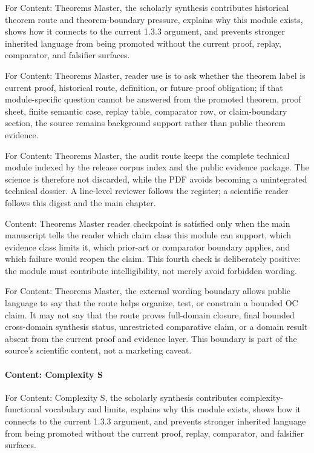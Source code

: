 For Content: Theorems Master, the scholarly synthesis contributes historical theorem route and theorem-boundary pressure, explains why this module exists, shows how it connects to the current 1.3.3 argument, and prevents stronger inherited language from being promoted without the current proof, replay, comparator, and falsifier surfaces.


For Content: Theorems Master, reader use is to ask whether the theorem label is current proof, historical route, definition, or future proof obligation; if that module-specific question cannot be answered from the promoted theorem, proof sheet, finite semantic case, replay table, comparator row, or claim-boundary section, the source remains background support rather than public theorem evidence.


For Content: Theorems Master, the audit route keeps the complete technical module indexed by the release corpus index and the public evidence package. The science is therefore not discarded, while the PDF avoids becoming a unintegrated technical dossier. A line-level reviewer follows the register; a scientific reader follows this digest and the main chapter.


Content: Theorems Master reader checkpoint is satisfied only when the main manuscript tells the reader which claim class this module can support, which evidence class limits it, which prior-art or comparator boundary applies, and which failure would reopen the claim. This fourth check is deliberately positive: the module must contribute intelligibility, not merely avoid forbidden wording.


For Content: Theorems Master, the external wording boundary allows public language to say that the route helps organize, test, or constrain a bounded OC claim. It may not say that the route proves full-domain closure, final bounded cross-domain synthesis status, unrestricted comparative claim, or a domain result absent from the current proof and evidence layer. This boundary is part of the source's scientific content, not a marketing caveat.


\paragraph{Content: Complexity S}

For Content: Complexity S, the scholarly synthesis contributes complexity-functional vocabulary and limits, explains why this module exists, shows how it connects to the current 1.3.3 argument, and prevents stronger inherited language from being promoted without the current proof, replay, comparator, and falsifier surfaces.


